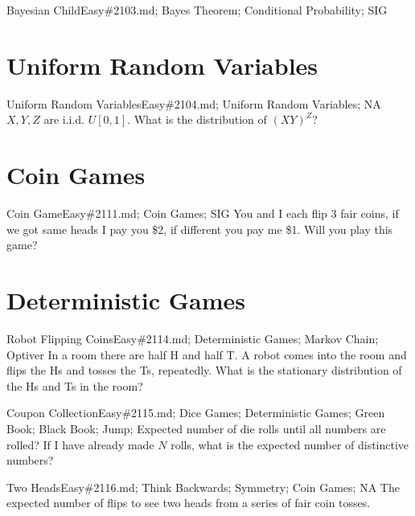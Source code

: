 \documentclass[oldfontcommands]{memoir}
\begin{document}
{\begin{question}{Bayesian Child}{Easy}{\#2103.md; Bayes Theorem; Conditional Probability; SIG}
\end{question}

\section{Uniform Random Variables}
\begin{question}{Uniform Random Variables}{Easy}{\#2104.md; Uniform Random Variables; NA}
$X, Y, Z$ are i.i.d. $U[0,1]$. What is the distribution of $(XY)^Z$?

\end{question}

\section{Coin Games}
\begin{question}{Coin Game}{Easy}{\#2111.md; Coin Games; SIG}
You and I each flip 3 fair coins, if we got same heads I pay you \$2, if different you pay me \$1. Will you play this game?

\end{question}

\section{Deterministic Games}
\begin{question}{Robot Flipping Coins}{Easy}{\#2114.md; Deterministic Games; Markov Chain; Optiver}
In a room there are half H and half T. A robot comes into the room and flips the Hs and tosses the Ts, repeatedly. What is the stationary distribution of the Hs and Ts in the room?

\end{question}

\begin{question}{Coupon Collection}{Easy}{\#2115.md; Dice Games; Deterministic Games; Green Book; Black Book; Jump;}
Expected number of die rolls until all numbers are rolled? If I have already made $N$ rolls, what is the expected number of distinctive numbers?

\end{question}

\begin{question}{Two Heads}{Easy}{\#2116.md; Think Backwards; Symmetry; Coin Games; NA}
The expected number of flips to see two heads from a series of fair coin tosses.

\end{question}

}
\end{document}
